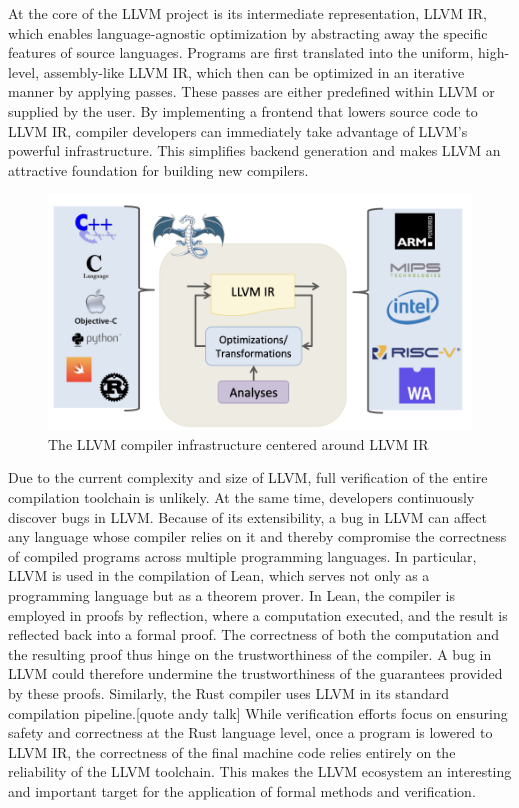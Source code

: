 At the core of the LLVM project is its intermediate representation, LLVM IR, which enables language-agnostic optimization by abstracting away the specific features of source languages. Programs are first translated into the uniform, high-level, assembly-like LLVM IR, which then can be optimized in an iterative manner by applying passes. These passes are either predefined within LLVM or supplied by the user. By implementing a frontend that lowers source code to LLVM IR, compiler developers can immediately take advantage of LLVM's powerful infrastructure. This  simplifies backend generation and makes LLVM an attractive foundation for building new compilers.

\begin{figure}[htbp]
  \centering
  \includegraphics[scale=0.4]{llvm.png}
 
  \caption{The LLVM compiler infrastructure centered around LLVM IR}
  \label{fig:your-label}
\end{figure}

Due to the current complexity and size of LLVM, full verification of the entire compilation toolchain is unlikely. At the same time, developers continuously discover bugs in LLVM. Because of its extensibility, a bug in LLVM can affect any language whose compiler relies on it and thereby compromise the correctness of compiled programs across multiple programming languages.
In particular, LLVM is used in the compilation of Lean, which serves not only as a programming language but  as a theorem prover. In Lean, the compiler is employed in proofs by reflection, where a computation  executed, and the result is reflected back into a formal proof. The correctness of both the computation and the resulting proof thus hinge on the trustworthiness of the compiler. A bug in LLVM could therefore undermine the trustworthiness of the guarantees provided by these proofs. Similarly, the Rust compiler uses LLVM in its standard compilation pipeline.[quote andy talk] While verification efforts focus on ensuring safety and correctness at the Rust language level, once a program is lowered to LLVM IR, the correctness of the final machine code relies entirely on the reliability of the LLVM toolchain. This makes the LLVM ecosystem an interesting and important target for the application of formal methods and verification.

